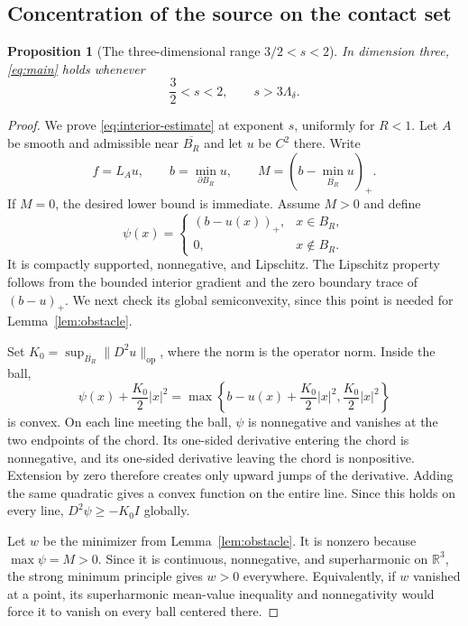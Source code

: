 \documentclass[11pt,a4paper,reqno]{amsart}
\theoremstyle{plain}
\newtheorem{proposition}[theorem]{Proposition}
\theoremstyle{remark}
\numberwithin{equation}{section}
\newcommand{\R}{\mathbb R}
\newcommand{\lam}{\Lambda_\delta}
\newcommand{\norm}[1]{\lVert#1\rVert}
\begin{document}
\subsection{Concentration of the source on the contact set}
\begin{proposition}[The three-dimensional range $3/2<s<2$]\label{prop:below-two}
In dimension three, \eqref{eq:main} holds whenever
\begin{equation}\label{eq:s-range}
 \frac32<s<2,\qquad s>3\lam.
\end{equation}
\end{proposition}
\begin{proof}
We prove \eqref{eq:interior-estimate} at exponent $s$, uniformly for $R<1$. Let $A$ be smooth and admissible near $\overline{B_R}$ and let $u$ be $C^2$ there. Write
\[
 f=L_Au,\qquad b=\min_{\partial B_R}u,\qquad
 M=\left(b-\min_{\overline{B_R}}u\right)_+.
\]
If $M=0$, the desired lower bound is immediate. Assume $M>0$ and define
\begin{equation}\label{eq:obstacle-from-u}
 \psi(x)=
 \begin{cases}
  (b-u(x))_+,&x\in B_R,\\
  0,&x\notin B_R.
 \end{cases}
\end{equation}
It is compactly supported, nonnegative, and Lipschitz. The Lipschitz property follows from the bounded interior gradient and the zero boundary trace of $(b-u)_+$. We next check its global semiconvexity, since this point is needed for Lemma~\ref{lem:obstacle}.

Set $K_0=\sup_{\overline{B_R}}\norm{D^2u}_{\mathrm{op}}$, where the norm is the operator norm. Inside the ball,
\[
 \psi(x)+\frac{K_0}2|x|^2
 =\max\left\{b-u(x)+\frac{K_0}2|x|^2,
                         \frac{K_0}2|x|^2\right\}
\]
is convex. On each line meeting the ball, $\psi$ is nonnegative and vanishes at the two endpoints of the chord. Its one-sided derivative entering the chord is nonnegative, and its one-sided derivative leaving the chord is nonpositive. Extension by zero therefore creates only upward jumps of the derivative. Adding the same quadratic gives a convex function on the entire line. Since this holds on every line, $D^2\psi\ge-K_0I$ globally.

Let $w$ be the minimizer from Lemma~\ref{lem:obstacle}. It is nonzero because $\max\psi=M>0$. Since it is continuous, nonnegative, and superharmonic on $\R^3$, the strong minimum principle gives $w>0$ everywhere. Equivalently, if $w$ vanished at a point, its superharmonic mean-value inequality and nonnegativity would force it to vanish on every ball centered there.


\end{proof}
\end{document}
